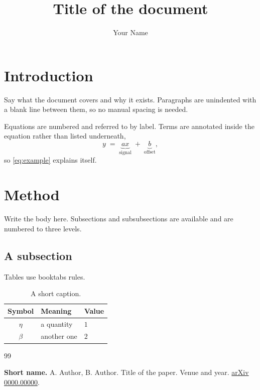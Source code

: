\documentclass[10pt,a4paper]{article}
\title{Title of the document}
\author{Your Name}
\begin{document}
\maketitle
\boldcontents

\section{Introduction}

Say what the document covers and why it exists. Paragraphs are unindented with
a blank line between them, so no manual spacing is needed.

Equations are numbered and referred to by label. Terms are annotated inside the
equation rather than listed underneath,
%
\begin{equation}
y \;=\; \underbrace{a x}_{\text{signal}} \;+\; \underbrace{b}_{\text{offset}},
\label{eq:example}
\end{equation}
%
so \eqref{eq:example} explains itself.

\section{Method}

Write the body here. Subsections and subsubsections are available and are
numbered to three levels.

\subsection{A subsection}

Tables use booktabs rules.

\begin{table}[H]
\centering\small
\begin{tabular}{cll}
\toprule
Symbol & Meaning & Value \\
\midrule
$\eta$ & a quantity   & $1$ \\
$\beta$ & another one & $2$ \\
\bottomrule
\end{tabular}
\caption{A short caption.}
\label{tab:example}
\end{table}

\begin{thebibliography}{99}\small

 \textbf{Short name.} A. Author, B. Author.
\newblock Title of the paper.
\newblock Venue and year.
\href{https://arxiv.org/abs/0000.00000}{arXiv 0000.00000}.

\end{thebibliography}
\end{document}

